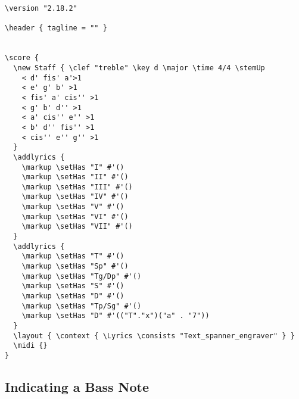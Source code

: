 \documentclass[
  DIV=calc,
  BCOR=5mm,
  12pt,
  headings=small,
  oneside,
  abstract=true,
  toc=bib,
  xcolor=dvipsnames,
  openany,
  english]{scrartcl}
\begin{document}
\begin{center}
\end{center}
\begin{scriptsize}
\begin{verbatim}
\version "2.18.2"

\header { tagline = "" }


\score {
  \new Staff { \clef "treble" \key d \major \time 4/4 \stemUp
    < d' fis' a'>1
    < e' g' b' >1
    < fis' a' cis'' >1
    < g' b' d'' >1
    < a' cis'' e'' >1
    < b' d'' fis'' >1
    < cis'' e'' g'' >1
  }
  \addlyrics {
    \markup \setHas "I" #'()
    \markup \setHas "II" #'()
    \markup \setHas "III" #'()
    \markup \setHas "IV" #'()
    \markup \setHas "V" #'()
    \markup \setHas "VI" #'()
    \markup \setHas "VII" #'()
  }
  \addlyrics {
    \markup \setHas "T" #'()
    \markup \setHas "Sp" #'()
    \markup \setHas "Tg/Dp" #'()
    \markup \setHas "S" #'()
    \markup \setHas "D" #'()
    \markup \setHas "Tp/Sg" #'()
    \markup \setHas "D" #'(("T"."x")("a" . "7"))
  }
  \layout { \context { \Lyrics \consists "Text_spanner_engraver" } }
  \midi {}
}
\end{verbatim}
\end{scriptsize}

\subsection{Indicating a Bass Note}
\end{document}
